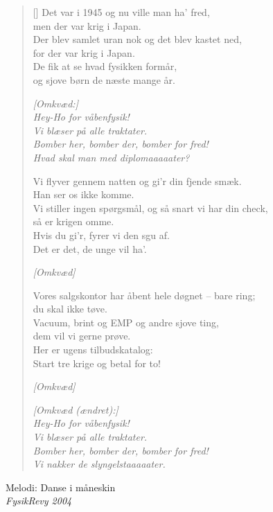 \begin{multicols}{2}
\settowidth{\versewidth}{og sjove børn de næste mange år.}
\begin{verse}[\versewidth]
Det var i 1945 og nu
ville man ha’ fred,\\
men der var krig i Japan.\\
Der blev samlet uran nok og det
blev kastet ned,\\
for der var krig i Japan.\\
De fik at se hvad fysikken formår,\\
og sjove børn de næste mange år.

\emph{[Omkvæd:]\\
Hey-Ho for våbenfysik!\\
Vi blæser på alle traktater.\\
Bomber her, bomber der, bomber
for fred!\\
Hvad skal man med diplomaaaaater?}

Vi flyver gennem natten og gi’r
din fjende smæk.\\
Han ser os ikke komme.\\
Vi stiller ingen spørgsmål, og
så snart vi har din check,\\
så er krigen omme.\\
Hvis du gi’r, fyrer vi den sgu af.\\
Det er det, de unge vil ha’.
\columnbreak

\emph{[Omkvæd]}

Vores salgskontor har åbent hele
døgnet – bare ring;\\
du skal ikke tøve.\\
Vacuum, brint og EMP og andre
sjove ting,\\
dem vil vi gerne prøve.\\
Her er ugens tilbudskatalog:\\
Start tre krige og betal for to!

\emph{[Omkvæd]}

\emph{[Omkvæd (ændret):]\\
Hey-Ho for våbenfysik!\\
Vi blæser på alle traktater.\\
Bomber her, bomber der, bomber
for fred!\\
Vi nakker de slyngelstaaaaater.}
\end{verse}
\end{multicols}

{Melodi: Danse i måneskin}\\[.2em]
{\small\itshape FysikRevy 2004}

